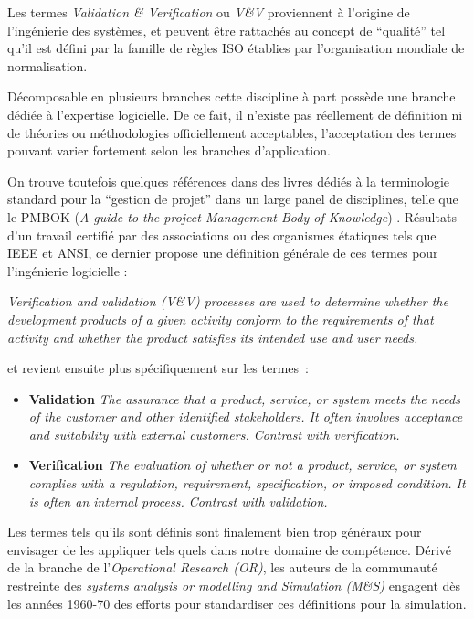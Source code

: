 Les termes \textit{Validation \& Verification} ou \textit{V\&V} proviennent à l'origine de l'ingénierie des systèmes, et peuvent être rattachés au concept de \enquote{qualité} tel qu'il est défini par la famille de règles ISO établies par l'organisation mondiale de normalisation. 

Décomposable en plusieurs branches cette discipline à part possède une branche dédiée à l'expertise logicielle. De ce fait, il n'existe pas réellement de définition ni de théories ou méthodologies officiellement acceptables, l'acceptation des termes pouvant varier fortement selon les branches d'application. 

On trouve toutefois quelques références dans des livres dédiés à la terminologie standard pour la \enquote{gestion de projet} dans un large panel de disciplines, telle que le PMBOK (\textit{A guide to the project Management Body of Knowledge}) \autocite{PMBOK2013}. Résultats d'un travail certifié par des associations ou des organismes étatiques tels que IEEE et ANSI, ce dernier propose une définition générale de ces termes pour l'ingénierie logicielle : 

\textit{Verification and validation (V\&V) processes are used to determine whether the development products of a given activity conform to the requirements of that activity and whether the product satisfies its intended use and user needs.}

et revient ensuite plus spécifiquement sur les termes : 

\begin{itemize}
\item \textbf{Validation} \textit{The assurance that a product, service, or system meets the needs of the customer and other identified stakeholders. It often involves acceptance and suitability with external customers. Contrast with verification.}
\item \textbf{Verification} \textit{The evaluation of whether or not a product, service, or system complies with a regulation, requirement, specification, or imposed condition. It is often an internal process. Contrast with validation.}
\end{itemize}

Les termes tels qu'ils sont définis sont finalement bien trop généraux pour envisager de les appliquer tels quels dans notre domaine de compétence. Dérivé de la branche de l'\textit{Operational Research (OR)}, les auteurs de la communauté restreinte des \textit{systems analysis or modelling and Simulation (M\&S) } engagent dès les années 1960-70 des efforts pour standardiser ces définitions pour la simulation.

